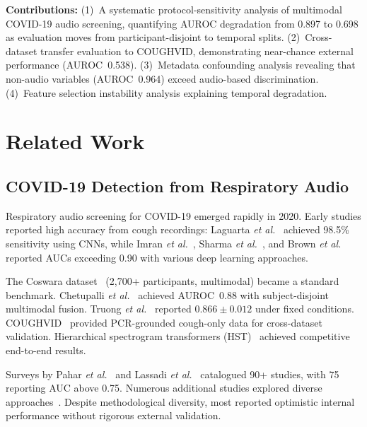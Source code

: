 \documentclass[conference]{IEEEtran}
\begin{document}
\textbf{Contributions:} (1)~A systematic protocol-sensitivity analysis of multimodal COVID-19 audio screening, quantifying AUROC degradation from 0.897 to 0.698 as evaluation moves from participant-disjoint to temporal splits. (2)~Cross-dataset transfer evaluation to COUGHVID, demonstrating near-chance external performance (AUROC~0.538). (3)~Metadata confounding analysis revealing that non-audio variables (AUROC~0.964) exceed audio-based discrimination. (4)~Feature selection instability analysis explaining temporal degradation.

\section{Related Work}
\label{sec:related}

\subsection{COVID-19 Detection from Respiratory Audio}

Respiratory audio screening for COVID-19 emerged rapidly in 2020. Early studies reported high accuracy from cough recordings: Laguarta \emph{et al.}~\cite{laguarta2020} achieved 98.5\% sensitivity using CNNs, while Imran \emph{et al.}~\cite{imran2020}, Sharma \emph{et al.}~\cite{sharma2020}, and Brown \emph{et al.}~\cite{brown2020} reported AUCs exceeding 0.90 with various deep learning approaches.

The Coswara dataset~\cite{bhattacharya2023} (2{,}700+ participants, multimodal) became a standard benchmark. Chetupalli \emph{et al.}~\cite{chetupalli2023} achieved AUROC~0.88 with subject-disjoint multimodal fusion. Truong \emph{et al.}~\cite{truong2024} reported $0.866 \pm 0.012$ under fixed conditions. COUGHVID~\cite{orlandic2021} provided PCR-grounded cough-only data for cross-dataset validation. Hierarchical spectrogram transformers (HST)~\cite{aytekin2024} achieved competitive end-to-end results.

Surveys by Pahar \emph{et al.}~\cite{pahar2022} and Lassadi \emph{et al.}~\cite{lassadi2022} catalogued 90+ studies, with 75 reporting AUC above 0.75. Numerous additional studies explored diverse approaches~\cite{muguli2021, rose2021, ehmer2021, avila2021, vaidya2021, abdullah2021, ostovan2021, saxena2021, garcia2021, fuster2021, wang2021resp, fagerlund2021, song2022, pinto2022, islam2026}. Despite methodological diversity, most reported optimistic internal performance without rigorous external validation.
\end{document}
